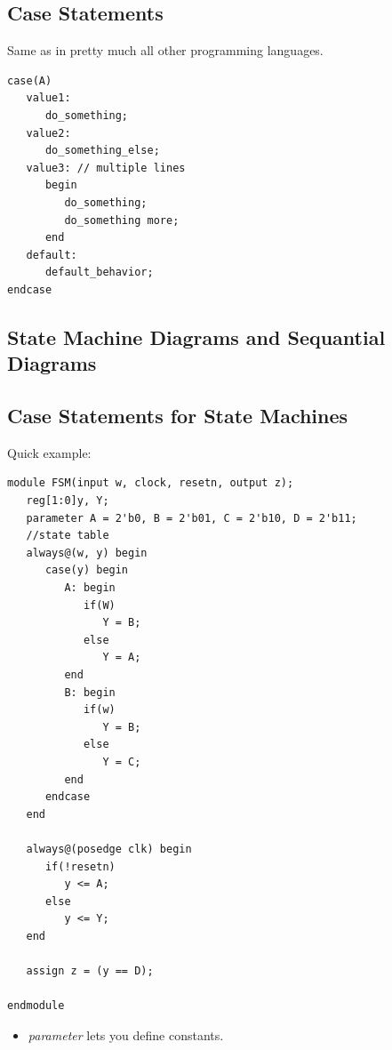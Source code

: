 \documentclass[a4paper,12pt]{report}
\begin{document}
\subsection{Case Statements}
Same as in pretty much all other programming languages. 
\begin{lstlisting}
case(A)
   value1:
      do_something;
   value2: 
      do_something_else;
   value3: // multiple lines
      begin
         do_something;
         do_something more;
      end
   default:
      default_behavior;
endcase
\end{lstlisting}

\subsection{State Machine Diagrams and Sequantial Diagrams}

\subsection{Case Statements for State Machines}
Quick example:
\begin{lstlisting}
module FSM(input w, clock, resetn, output z);
   reg[1:0]y, Y;
   parameter A = 2'b0, B = 2'b01, C = 2'b10, D = 2'b11;
   //state table
   always@(w, y) begin
      case(y) begin
         A: begin
            if(W) 
               Y = B;
            else  
               Y = A;
         end
         B: begin
            if(w)
               Y = B;
            else 
               Y = C;
         end
      endcase
   end

   always@(posedge clk) begin
      if(!resetn)
         y <= A;
      else  
         y <= Y;
   end

   assign z = (y == D);

endmodule
\end{lstlisting}
\begin{itemize}
\item \textit{parameter} lets you define constants. 
\end{itemize}
\end{document}
